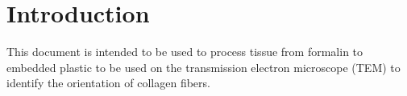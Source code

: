 \section{Introduction}
This document is intended to be used to process tissue from formalin to
embedded plastic to be used on the transmission electron microscope (TEM) to
identify the orientation of collagen fibers.
